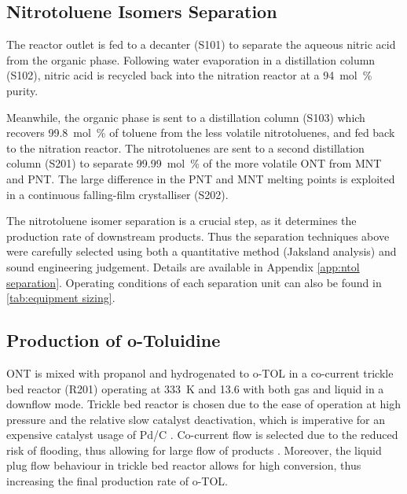 
\subsection{Nitrotoluene Isomers Separation}
The reactor outlet is fed to a decanter (S101) to separate the aqueous nitric acid from the organic phase. Following water evaporation in a distillation column (S102), nitric acid is recycled back into the nitration reactor at a \SI{94}{mol\percent} purity.

Meanwhile, the organic phase is sent to a distillation column (S103) which recovers \SI{99.8}{mol\percent} of toluene from the less volatile nitrotoluenes, and fed back to the nitration reactor. The nitrotoluenes are sent to a second distillation column (S201) to separate \SI{99.99}{mol\percent} of the more volatile ONT from MNT and PNT. The large difference in the PNT and MNT melting points is exploited in a continuous falling-film crystalliser (S202). 


The nitrotoluene isomer separation is a crucial step, as it determines the production rate of downstream products. Thus the separation techniques above were carefully selected using both a quantitative method (Jaksland analysis) \cite{jaksland_separation_1995} and sound engineering judgement. Details are available in Appendix \ref{app:ntol separation}. Operating conditions of each separation unit can also be found in \cref{tab:equipment sizing}. 

\subsection{Production of o-Toluidine}
ONT is mixed with propanol and hydrogenated to o-TOL in a co-current trickle bed reactor (R201) operating at \SI{333}{\K} and \SI{13.6}{\atm} with both gas and liquid in a downflow mode. Trickle bed reactor is chosen due to the ease of operation at high pressure and the relative slow catalyst deactivation, which is imperative for an expensive catalyst usage of Pd/C \cite{vemala_hydrodynamic_nodate}. Co-current flow is selected due to the reduced risk of flooding, thus allowing for large flow of products \cite{vemala_hydrodynamic_nodate}. Moreover, the liquid plug flow behaviour in trickle bed reactor allows for high conversion, thus increasing the final production rate of o-TOL. 

